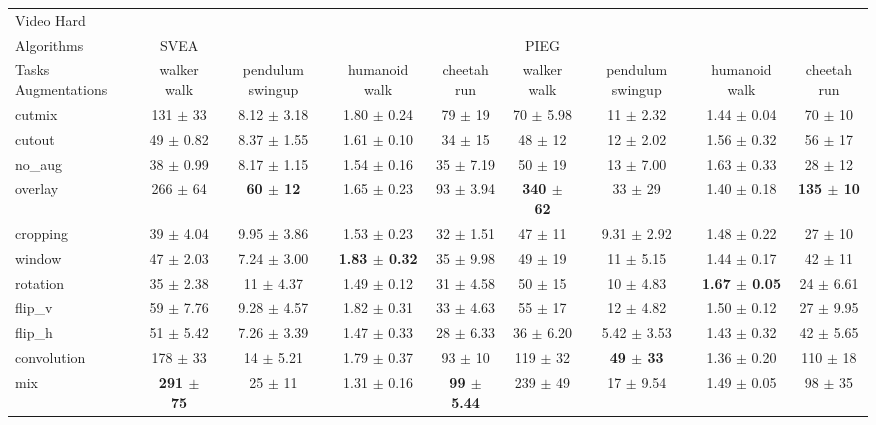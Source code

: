 \begin{tabular}{lcccccccc}
Video Hard & & & & & & & & \\
Algorithms & SVEA & & & & PIEG & & & \\
Tasks Augmentations & walker walk & pendulum swingup & humanoid walk & cheetah run & walker walk & pendulum swingup & humanoid walk & cheetah run \\
cutmix          & 131 $\pm$ 33 & 8.12 $\pm$ 3.18 & 1.80 $\pm$ 0.24 & 79 $\pm$ 19 & 70 $\pm$ 5.98 & 11 $\pm$ 2.32 & 1.44 $\pm$ 0.04 & 70 $\pm$ 10 \\
cutout          & 49 $\pm$ 0.82 & 8.37 $\pm$ 1.55 & 1.61 $\pm$ 0.10 & 34 $\pm$ 15 & 48 $\pm$ 12 & 12 $\pm$ 2.02 & 1.56 $\pm$ 0.32 & 56 $\pm$ 17 \\
no\_aug         & 38 $\pm$ 0.99 & 8.17 $\pm$ 1.15 & 1.54 $\pm$ 0.16 & 35 $\pm$ 7.19 & 50 $\pm$ 19 & 13 $\pm$ 7.00 & 1.63 $\pm$ 0.33 & 28 $\pm$ 12 \\
overlay         & 266 $\pm$ 64 & \textbf{60 $\pm$ 12} & 1.65 $\pm$ 0.23 & 93 $\pm$ 3.94 & \textbf{340 $\pm$ 62} & 33 $\pm$ 29 & 1.40 $\pm$ 0.18 & \textbf{135 $\pm$ 10} \\
cropping        & 39 $\pm$ 4.04 & 9.95 $\pm$ 3.86 & 1.53 $\pm$ 0.23 & 32 $\pm$ 1.51 & 47 $\pm$ 11 & 9.31 $\pm$ 2.92 & 1.48 $\pm$ 0.22 & 27 $\pm$ 10 \\
window          & 47 $\pm$ 2.03 & 7.24 $\pm$ 3.00 & \textbf{1.83 $\pm$ 0.32} & 35 $\pm$ 9.98 & 49 $\pm$ 19 & 11 $\pm$ 5.15 & 1.44 $\pm$ 0.17 & 42 $\pm$ 11 \\
rotation        & 35 $\pm$ 2.38 & 11 $\pm$ 4.37 & 1.49 $\pm$ 0.12 & 31 $\pm$ 4.58 & 50 $\pm$ 15 & 10 $\pm$ 4.83 & \textbf{1.67 $\pm$ 0.05} & 24 $\pm$ 6.61 \\
flip\_v         & 59 $\pm$ 7.76 & 9.28 $\pm$ 4.57 & 1.82 $\pm$ 0.31 & 33 $\pm$ 4.63 & 55 $\pm$ 17 & 12 $\pm$ 4.82 & 1.50 $\pm$ 0.12 & 27 $\pm$ 9.95 \\
flip\_h         & 51 $\pm$ 5.42 & 7.26 $\pm$ 3.39 & 1.47 $\pm$ 0.33 & 28 $\pm$ 6.33 & 36 $\pm$ 6.20 & 5.42 $\pm$ 3.53 & 1.43 $\pm$ 0.32 & 42 $\pm$ 5.65 \\
convolution     & 178 $\pm$ 33 & 14 $\pm$ 5.21 & 1.79 $\pm$ 0.37 & 93 $\pm$ 10 & 119 $\pm$ 32 & \textbf{49 $\pm$ 33} & 1.36 $\pm$ 0.20 & 110 $\pm$ 18 \\
mix             & \textbf{291 $\pm$ 75} & 25 $\pm$ 11 & 1.31 $\pm$ 0.16 & \textbf{99 $\pm$ 5.44} & 239 $\pm$ 49 & 17 $\pm$ 9.54 & 1.49 $\pm$ 0.05 & 98 $\pm$ 35 \\
\end{tabular}